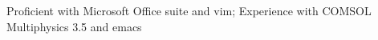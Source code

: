 \item Proficient with Microsoft Office suite and vim; Experience with COMSOL Multiphysics 3.5 and emacs
